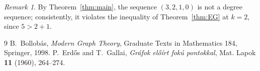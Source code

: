 \documentclass[11pt]{amsart}
\theoremstyle{definition}
\theoremstyle{remark}
\newtheorem*{remark}{Remark}
\begin{document}
\begin{remark}
By Theorem~\ref{thm:main}, the sequence $(3,2,1,0)$ is not a degree sequence;
consistently, it violates the inequality of Theorem~\ref{thm:EG} at $k=2$,
since $5>2+1$.
\end{remark}

\begin{thebibliography}{9}
 B.~Bollob\'as, \emph{Modern Graph Theory}, Graduate Texts in
Mathematics 184, Springer, 1998.
 P.~Erd\H{o}s and T.~Gallai, \emph{Gr\'afok el\H{o}\'irt fok\'u
pontokkal}, Mat. Lapok \textbf{11} (1960), 264--274.
\end{thebibliography}
\end{document}
